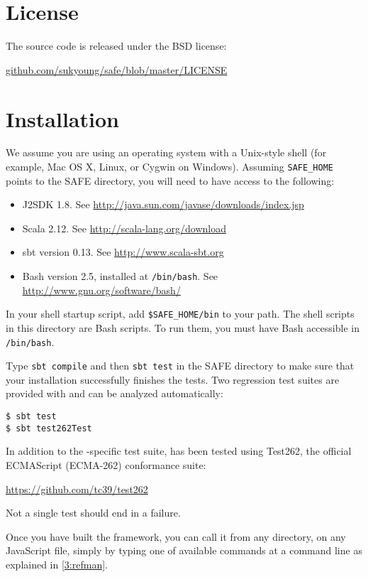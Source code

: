 \section{License}
The \safe source code is released under the BSD license:
\begin{center}
\url{github.com/sukyoung/safe/blob/master/LICENSE}
\end{center}


\section{Installation}
We assume you are using an operating system with a Unix-style shell
(for example, Mac OS X, Linux, or Cygwin on Windows).
Assuming \verb!SAFE_HOME! points to the SAFE directory,
you will need to have access to the following:
\begin{itemize}
\item J2SDK 1.8.  See
\url{http://java.sun.com/javase/downloads/index.jsp}
\item Scala 2.12.  See
\url{http://scala-lang.org/download}
\item sbt version 0.13.  See
\url{http://www.scala-sbt.org}
\item Bash version 2.5, installed at \verb!/bin/bash!.  See
\url{http://www.gnu.org/software/bash/}
\end{itemize}

In your shell startup script, add \verb!$SAFE_HOME/bin! to your path.
The shell scripts in this directory are Bash scripts.
To run them, you must have Bash accessible in \verb!/bin/bash!.

Type \verb!sbt compile! and then \verb!sbt test! in the SAFE directory to make sure that
your installation successfully finishes the tests.
Two regression test suites are provided with \safe and can be
analyzed automatically:
\begin{verbatim}
$ sbt test
$ sbt test262Test
\end{verbatim}
In addition to the \safe-specific test suite,
 has been tested using Test262, the official ECMAScript (ECMA-262) conformance suite:
\begin{center}
\url{https://github.com/tc39/test262}
\end{center}
Not a single test should end in a failure.

Once you have built the framework, you can call it from any directory,
on any JavaScript file, simply by typing one of available commands at a command line
as explained in \cref{3:refman}.

